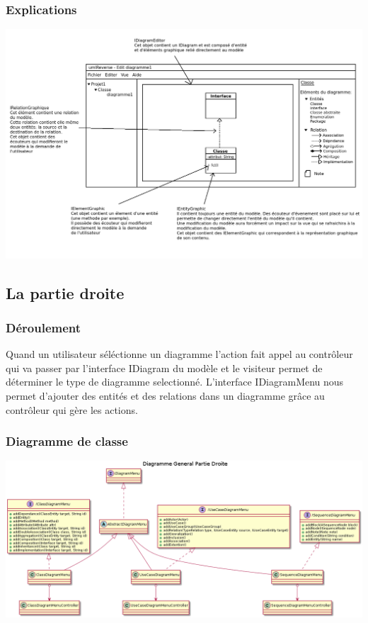 \documentclass[a4paper,10pt]{article}
\begin{document}
    \subsubsection{Explications}
	\begin{center}
	  \includegraphics[width=\textwidth]{Image/demonstration.png}
	\end{center}
      
  \subsection{La partie droite}
    \subsubsection{Déroulement}
      Quand un utilisateur séléctionne un diagramme l'action fait appel au contrôleur qui va passer par l'interface IDiagram du modèle et le visiteur 
      permet de déterminer le type de diagramme selectionné.
      L'interface IDiagramMenu nous permet d'ajouter des entités et des relations dans un diagramme grâce au contrôleur qui gère les actions.
       
    \subsubsection{Diagramme de classe} 
          \begin{center}
	     \includegraphics[width=15cm]{Image/DiagramGenrDroite.png}
          \end{center}
          
\end{document}
